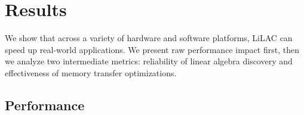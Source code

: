 
\section{Results}
\label{sec:results}

We show that across a variety of hardware and software platforms, LiLAC can
speed up real-world applications.
We present raw performance impact first, then we analyze two intermediate
metrics: reliability of linear algebra discovery and effectiveness of memory
transfer optimizations.

\subsection{Performance}

